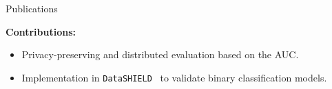 \documentclass[t,10pt]{beamer}
\begin{document}
%
%
%
%
%


\begin{frame}{Publications \citep{schalk2022dauc,schalk2022dsBinVal}}
  \vspace{-0.2cm}
  \begin{figure}
    \centering
  \end{figure}
  \textbf{Contributions:}
  \begin{itemize}
    \item
      Privacy-preserving and distributed evaluation based on the AUC.
    \item
      Implementation in \texttt{DataSHIELD}~\citep{gaye2014datashield} to validate binary classification models.
  \end{itemize}
\end{frame}
\end{document}

